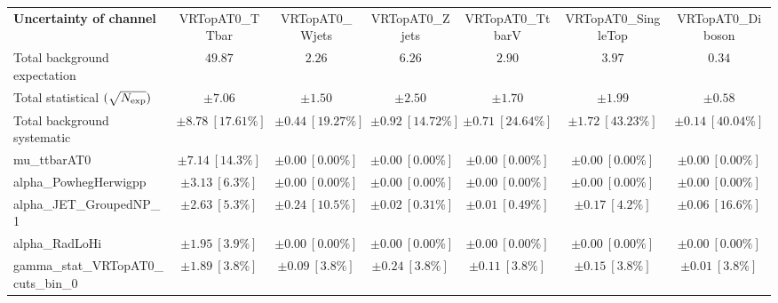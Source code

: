 
\begin{sidewaystable}
\begin{center}
\setlength{\tabcolsep}{0.0pc}
\begin{tabular*}{\textwidth}{@{\extracolsep{\fill}}lcccccc}
\noalign{\smallskip}\hline\noalign{\smallskip}
{\bf Uncertainty of channel}                                    & VRTopAT0\_TTbar            & VRTopAT0\_Wjets            & VRTopAT0\_Zjets            & VRTopAT0\_TtbarV            & VRTopAT0\_SingleTop            & VRTopAT0\_Diboson            \\
\noalign{\smallskip}\hline\noalign{\smallskip}
Total background expectation             &  $49.87$        &  $2.26$        &  $6.26$        &  $2.90$        &  $3.97$        &  $0.34$       \\
\noalign{\smallskip}\hline\noalign{\smallskip}
Total statistical $(\sqrt{N_{\rm exp}})$              & $\pm 7.06$        & $\pm 1.50$        & $\pm 2.50$        & $\pm 1.70$        & $\pm 1.99$        & $\pm 0.58$       \\
Total background systematic               & $\pm 8.78\ [17.61\%] $        & $\pm 0.44\ [19.27\%] $        & $\pm 0.92\ [14.72\%] $        & $\pm 0.71\ [24.64\%] $        & $\pm 1.72\ [43.23\%] $        & $\pm 0.14\ [40.04\%] $             \\
\noalign{\smallskip}\hline\noalign{\smallskip}
\noalign{\smallskip}\hline\noalign{\smallskip}
mu\_ttbarAT0         & $\pm 7.14\ [14.3\%] $          & $\pm 0.00\ [0.00\%] $          & $\pm 0.00\ [0.00\%] $          & $\pm 0.00\ [0.00\%] $          & $\pm 0.00\ [0.00\%] $          & $\pm 0.00\ [0.00\%] $       \\
alpha\_PowhegHerwigpp         & $\pm 3.13\ [6.3\%] $          & $\pm 0.00\ [0.00\%] $          & $\pm 0.00\ [0.00\%] $          & $\pm 0.00\ [0.00\%] $          & $\pm 0.00\ [0.00\%] $          & $\pm 0.00\ [0.00\%] $       \\
alpha\_JET\_GroupedNP\_1         & $\pm 2.63\ [5.3\%] $          & $\pm 0.24\ [10.5\%] $          & $\pm 0.02\ [0.31\%] $          & $\pm 0.01\ [0.49\%] $          & $\pm 0.17\ [4.2\%] $          & $\pm 0.06\ [16.6\%] $       \\
alpha\_RadLoHi         & $\pm 1.95\ [3.9\%] $          & $\pm 0.00\ [0.00\%] $          & $\pm 0.00\ [0.00\%] $          & $\pm 0.00\ [0.00\%] $          & $\pm 0.00\ [0.00\%] $          & $\pm 0.00\ [0.00\%] $       \\
gamma\_stat\_VRTopAT0\_cuts\_bin\_0         & $\pm 1.89\ [3.8\%] $          & $\pm 0.09\ [3.8\%] $          & $\pm 0.24\ [3.8\%] $          & $\pm 0.11\ [3.8\%] $          & $\pm 0.15\ [3.8\%] $          & $\pm 0.01\ [3.8\%] $       \\

\end{tabular*}
\end{center}
\end{sidewaystable}
